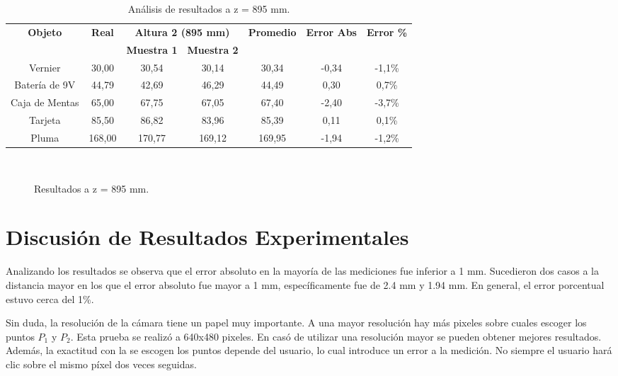\documentclass[]{article}
\begin{document}
\begin{table}[H]
	\centering
	\begin{tabular}{|c|c|c|c|c|c|c|}
		\hline
		\multirow{2}{*}{\textbf{Objeto}} & \multirow{2}{*}{\textbf{Real}} & \multicolumn{2}{c|}{\textbf{Altura 2 (895 mm)}} & \multirow{2}{*}{\textbf{Promedio}} & \multirow{2}{*}{\textbf{Error Abs}} & \multirow{2}{*}{\textbf{Error \%}} \\ \cline{3-4}
		 &  & \textbf{Muestra 1} & \textbf{Muestra 2} &  &  &  \\ \hline
		Vernier & 30,00 & 30,54 & 30,14 & 30,34 & -0,34 & -1,1\% \\ \hline
		Batería de 9V & 44,79 & 42,69 & 46,29 & 44,49 & 0,30 & 0,7\% \\ \hline
		Caja de Mentas & 65,00 & 67,75 & 67,05 & 67,40 & -2,40 & -3,7\% \\ \hline
		Tarjeta & 85,50 & 86,82 & 83,96 & 85,39 & 0,11 & 0,1\% \\ \hline
		Pluma & 168,00 & 170,77 & 169,12 & 169,95 & -1,94 & -1,2\% \\ \hline
		\end{tabular}
	\label{table:resultados-2}
	\caption{Análisis de resultados a z = 895 mm.}
\end{table}


\begin{figure}[H]
	\centering
	\\
	\caption{Resultados a z = 895 mm.}
	\label{fig:resultados-2}
\end{figure}

\section{Discusión de Resultados Experimentales}

Analizando los resultados se observa que el error absoluto en la mayoría de las mediciones fue inferior a 1 mm.  Sucedieron dos casos a la distancia mayor en los que el error absoluto fue mayor a 1 mm, específicamente fue de 2.4 mm y 1.94 mm. En general, el error porcentual estuvo cerca del 1\%.

Sin duda, la resolución de la cámara tiene un papel muy importante. A una mayor resolución hay más pixeles sobre cuales escoger los puntos $P_1$ y $P_2$. Esta prueba se realizó a 640x480 pixeles. En casó de utilizar una resolución mayor se pueden obtener mejores resultados. Además, la exactitud con la se escogen los puntos depende del usuario, lo cual introduce un error a la medición. No siempre el usuario hará clic sobre el mismo píxel dos veces seguidas.
\end{document}
